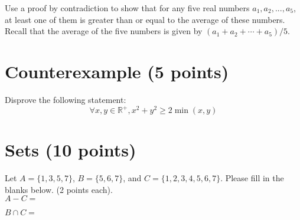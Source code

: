 \documentclass[11pt]{article}
\def\Q{\mathbb{Q}}
\def\N{\mathbb{N}}
\def\sectionOneA#1{}
\def\sectionOneB#1{}
\def\sectionTwoA#1{#1}
\def\sectionTwoB#1{}
\def\sectionVicsection#1{}
\newcounter{pgpts}
\newcounter{cumpts}
\newcommand{\cnewpage}{\addtocounter{cumpts}{\value{pgpts}}\newpage\setcounter{pgpts}{0}}
\newcommand{\ignore}[1]{}
\begin{document}
Use a proof by contradiction to show that for any five real numbers $a_1, a_2, ..., a_5$, at least one of them is greater than or equal to the average of these numbers. Recall that the average of the five numbers is given by $(a_1+a_2+\cdots+a_5)/5$.

\vspace*{12cm}


\section{Counterexample (5 points)}\addtocounter{pgpts}{5}
Disprove the following statement:\\
\sectionOneA{$$\forall x,y\in \N: \frac{x+y}{x-y}\in \mathbb{Q}$$}
\sectionOneB{$$\forall x,y\in \Q^+: \sqrt{x*y}\not\in\Q^+$$} %
\sectionTwoA{$$\forall x,y\in \mathbb{R}^+, x^2+y^2\geq 2\min(x,y)$$}
\sectionTwoB{$$\forall x,y\in \Q^+: \sqrt{x*y}\not\in\Q^+$$} %
\sectionVicsection{$$ (\forall x,y \in \mathbb{Q}): x^2 + y^2 +xy \geq x+y$$}


\cnewpage

\section{Sets (10 points)}\addtocounter{pgpts}{10}

\ignore{
Let \sectionOneA{$A=\{4,6,8\}$}\sectionOneB{$A=\{1,5,9\}$}\sectionTwoA{$A=\{3,6,9\}$}\sectionTwoB{$A=\{4,7,10\}$}
\sectionVicsection{$A=\{1,3,5,7\}$, $B=\{1,2,3,4\}$}
and $C=\{1,2,3,4,5,6,7\}$. 
}
Let \sectionOneA{$A=\{2,4,6,8\}$, $B=\{1,2,3,4\}$,
and $C=\{1,2,3,4,5,6,7\}$}\sectionTwoA{$A=\{1,3,5,7\}$, $B=\{5,6,7\}$,
and $C=\{1,2,3,4,5,6,7\}$}. Please fill in the blanks below. (2 points each).\\[9ex]

$A - C = $
\vspace*{2cm}

$B\cap C=$
\vspace*{2cm}
\end{document}
